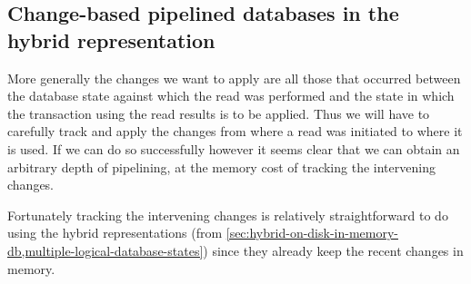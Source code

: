 \documentclass[11pt,a4paper]{article}
\begin{document}
\subsection{Change-based pipelined databases in the hybrid representation}

More generally the changes we want to apply are all those that occurred between
the database state against which the read was performed and the state in which
the transaction using the read results is to be applied. Thus we will have to
carefully track and apply the changes from where a read was initiated to where
it is used. If we can do so successfully however it seems clear that we can
obtain an arbitrary depth of pipelining, at the memory cost of tracking the
intervening changes.

Fortunately tracking the intervening changes is relatively straightforward to
do using the hybrid representations (from
\cref{sec:hybrid-on-disk-in-memory-db,multiple-logical-database-states}) since
they already keep the recent changes in memory.
\end{document}
